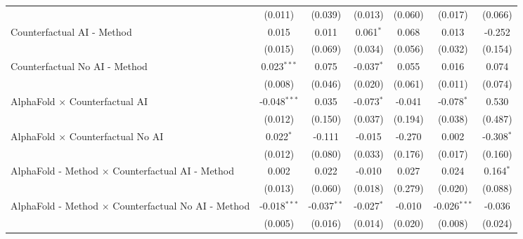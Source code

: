 \begin{tabular}{lcccccc}
                                                              & (0.011)        & (0.039)       & (0.013)       & (0.060)       & (0.017)        & (0.066)\\   
   Counterfactual AI - Method                                 & 0.015          & 0.011         & 0.061$^{*}$   & 0.068         & 0.013          & -0.252\\   
                                                              & (0.015)        & (0.069)       & (0.034)       & (0.056)       & (0.032)        & (0.154)\\   
   Counterfactual No AI - Method                              & 0.023$^{***}$  & 0.075         & -0.037$^{*}$  & 0.055         & 0.016          & 0.074\\   
                                                              & (0.008)        & (0.046)       & (0.020)       & (0.061)       & (0.011)        & (0.074)\\   
   AlphaFold $\times$ Counterfactual AI                       & -0.048$^{***}$ & 0.035         & -0.073$^{*}$  & -0.041        & -0.078$^{*}$   & 0.530\\   
                                                              & (0.012)        & (0.150)       & (0.037)       & (0.194)       & (0.038)        & (0.487)\\   
   AlphaFold $\times$ Counterfactual No AI                    & 0.022$^{*}$    & -0.111        & -0.015        & -0.270        & 0.002          & -0.308$^{*}$\\   
                                                              & (0.012)        & (0.080)       & (0.033)       & (0.176)       & (0.017)        & (0.160)\\   
   AlphaFold - Method $\times$ Counterfactual AI - Method     & 0.002          & 0.022         & -0.010        & 0.027         & 0.024          & 0.164$^{*}$\\   
                                                              & (0.013)        & (0.060)       & (0.018)       & (0.279)       & (0.020)        & (0.088)\\   
   AlphaFold - Method $\times$ Counterfactual No AI - Method  & -0.018$^{***}$ & -0.037$^{**}$ & -0.027$^{*}$  & -0.010        & -0.026$^{***}$ & -0.036\\   
                                                              & (0.005)        & (0.016)       & (0.014)       & (0.020)       & (0.008)        & (0.024)\\   
   \midrule

\end{tabular}
